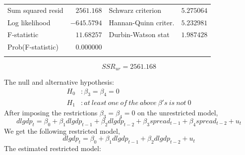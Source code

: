 \documentclass[12pt]{report}
\begin{document}
\begin{table}[H]
\begin{tabular}{lrrrr}
		\multicolumn{1}{l}{Sum squared resid}&\multicolumn{1}{r}{$2561.168$}&\multicolumn{2}{l}{Schwarz criterion}&\multicolumn{1}{r}{$5.275064$}\\
		\multicolumn{1}{l}{Log likelihood}&\multicolumn{1}{r}{$-645.5794$}&\multicolumn{2}{l}{Hannan-Quinn criter.}&\multicolumn{1}{r}{$5.232981$}\\
		\multicolumn{1}{l}{F-statistic}&\multicolumn{1}{r}{$11.68257$}&\multicolumn{2}{l}{Durbin-Watson stat}&\multicolumn{1}{r}{$1.987428$}\\
		\multicolumn{1}{l}{Prob(F-statistic)}&\multicolumn{1}{r}{$0.000000$}&\multicolumn{1}{c}{}&\multicolumn{1}{c}{}&\multicolumn{1}{c}{}\\
		[4.5pt] \hline \\ [-4.5pt]
	\end{tabular}
	$$SSR_{ur} = 2561.168$$
\end{table}
\vspace{-\baselineskip}
\noindent The null and alternative hypothesis:
\begin{align*}
	H_0&: \beta_3 = \beta_4 = 0 \\
	H_1&: at\ least\ one\ of\ the\ above\ \beta's\ is\ not\ 0
\end{align*}
\noindent After imposing the restrictions $\beta_3 = \beta_4 = 0$ on the unrestricted model, $$dlgdp_t = \beta_0 + \beta_1dlgdp_{t-1} + \beta_2dlgdp_{t-2} + \beta_3spread_{t-1} + \beta_4spread_{t-2} + u_t$$ We get the following restricted model, 
$$dlgdp_t = \beta_0 + \beta_1dlgdp_{t-1} + \beta_2dlgdp_{t-2} + u_t$$
\noindent The estimated restricted model:
\end{document}
